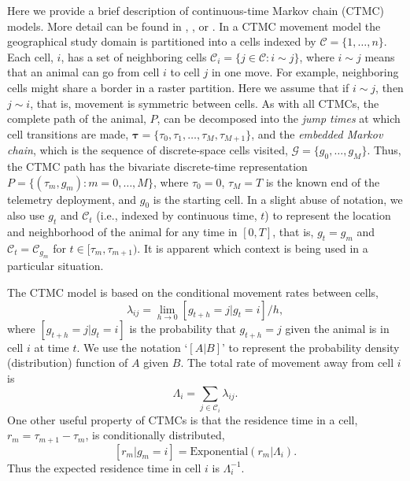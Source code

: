 \documentclass[12pt]{article}
\newcommand{\btau}{\ensuremath{\boldsymbol{\tau}}}
\newcommand{\fG}{\ensuremath{\mathcal{G}}}
\newcommand{\fC}{\ensuremath{\mathcal{C}}}
\begin{document}
Here we provide a brief description of continuous-time Markov chain (CTMC) models. More detail can be found in \citet{norris1998markov}, \cite{Johnson353516}, or \cite{Hanks:2015aa}. In a CTMC movement model the geographical study domain is partitioned into a cells indexed by $\fC = \{1,\dots,n\}$. Each cell, $i$, has a set of neighboring cells $\fC_i = \{j\in \fC: i \sim j\}$, where $i\sim j$ means that an animal can go from cell $i$ to cell $j$ in one move. For example, neighboring cells might share a border in a raster partition. Here we assume that if $i\sim j$, then $j\sim i$, that is, movement is symmetric between cells. As with all CTMCs, the complete path of the animal, $P$, can be decomposed into the {\it jump times} at which cell transitions are made, $\btau = \{\tau_0,\tau_1,\dots,\tau_M, \tau_{M+1}\}$, and the {\it embedded Markov chain}, which is the sequence of discrete-space cells visited, $\fG = \{g_0,\dots,g_M\}$. Thus, the CTMC path has the bivariate discrete-time representation $P=\{(\tau_m, g_m):m=0,\dots,M\}$, where $\tau_0 = 0$, $\tau_{M} = T$ is the known end of the telemetry deployment, and $g_0$ is the starting cell. In a slight abuse of notation, we also use $g_t$ and $\fC_t$ (i.e., indexed by continuous time, $t$) to represent the location and neighborhood of the animal for any time in $[0,T]$, that is, $g_t = g_m$ and $\fC_t = \fC_{g_m}$ for $t \in [\tau_m, \tau_{m+1})$. It is apparent which context is being used in a particular situation.

The CTMC model is based on the conditional movement rates between cells,
\begin{equation}
\lambda_{ij} = \lim_{h \to 0} [g_{t+h}=j|g_t = i]/h,
\end{equation}
where $[g_{t+h}=j|g_t=i]$ is the probability that $g_{t+h} = j$ given the animal is in cell $i$ at time $t$.
We use the notation `$[A|B]$' to represent the probability density (distribution) function of $A$ given $B$. The total rate of movement away from cell $i$ is 
\begin{equation}
\label{eq:total.haz}
\Lambda_i = \sum_{j\in\fC_i} \lambda_{ij}.
\end{equation}
One other useful property of CTMCs is that the residence time in a cell, $r_m = \tau_{m+1}-\tau_{m}$, is conditionally distributed,
\[
[r_m|g_m=i] = \text{Exponential}(r_m|\Lambda_i).
\]
Thus the expected residence time in cell $i$ is $\Lambda_i^{-1}$. 
\end{document}
